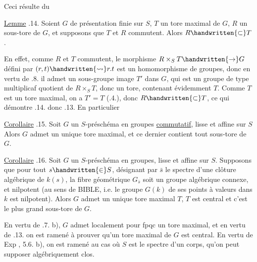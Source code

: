 
Ceci résulte du 

\uline{Lemme} .14. Soient $G$  de présentation finie sur $S$, $T$ un tore maximal de $G$,  $R$ un sous-tore de $G$, et supposons que $T$ et $R$ commutent. Alors $R\handwritten{\subset} T$.

En effet, comme $R$ et $T$ commutent, le morphisme $R\times_S T\handwritten{\to}G$ défini  par $(r,t)\handwritten{\rightsquigarrow}r.t$ est un homomorphisme de groupes, donc en vertu de .8. il admet un sous-groupe image $T'$ dans $G$, qui est un groupe de type multiplicaf quotient de $R\times_S T$, donc un tore, contenant évidemment $T$. Comme $T$ est un tore maximal, on a $T'=T$ (.4.), donc $R\handwritten{\subset}T$,  ce qui démontre .14. donc .13. En particulier

\uline{Corollaire} .15. Soit $G$ un $S$-préschéma en groupes  \uline{commutatif}, lisse et affine sur $S$\handwritten{,}  Alors $G$ admet un unique tore maximal, et ce  dernier contient tout sous-tore de $G$.

\uline{Corollaire} .16. Soit $G$ un $S$-préschéma en groupes, lisse et affine sur $S$. Supposons que pour tout $s\handwritten{\in}S$, désignant par $\bar s$ le spectre d'une clôture algébrique  de $k(s)$, la fibre géométrique $G_{\bar s}$ soit un groupe algébrique connexe, et nilpotent (au sens de BIBLE, i.e. le groupe $G(k)$ de ses points à valeurs dans $k$ est nilpotent).  Alors $G$ admet un unique tore maximal $T$,  $T$ est central et c'est le plus grand sous-tore de $G$.

En vertu de .7. b), $G$ admet localement pour fpqc un tore maximal, et en vertu de .13. on est ramené à prouver qu'un tore maximal de $G$ est central. En vertu de Exp , 5.6. b), on est ramené au cas où $S$ est le spectre d'un corps, qu'on peut supposer algébriquement clos.
